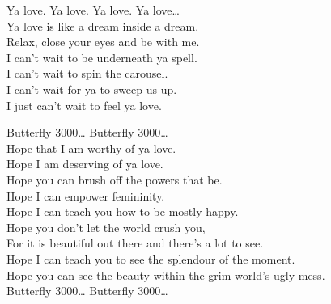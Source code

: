 Ya love. Ya love. Ya love. Ya love… \\

Ya love is like a dream inside a dream. \\
Relax, close your eyes and be with me. \\

I can't wait to be underneath ya spell. \\
I can't wait to spin the carousel. \\
I can't wait for ya to sweep us up. \\
I just can't wait to feel ya love. \\




Butterfly 3000… Butterfly 3000… \\

Hope that I am worthy of ya love. \\
Hope I am deserving of ya love. \\
Hope you can brush off the powers that be. \\
Hope I can empower femininity. \\
Hope I can teach you how to be mostly happy. \\
Hope you don't let the world crush you, \\
For it is beautiful out there and there's a lot to see. \\
Hope I can teach you to see the splendour of the moment. \\
Hope you can see the beauty within the grim world's ugly mess. \\

Butterfly 3000… Butterfly 3000… \\
